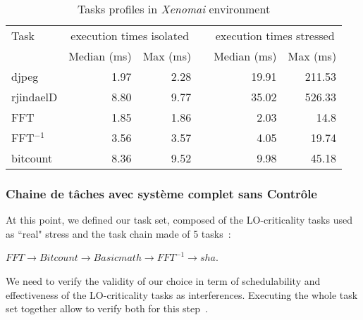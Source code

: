 \documentclass[french, a4paper, 11pt, twoside, pdftex]{StyleThese}
\begin{document}
                        \begin{table}[ht]
                            \centering
                            \caption{Tasks profiles in \textit{Xenomai} environment}
                            \label{tab:Stress}
                        \begin{tabular}{@{}lrrcrr@{}}  %
                        \toprule
                        Task & \multicolumn{2}{c}{execution times isolated} & \phantom{abc}& \multicolumn{2}{c}{execution times stressed} \\
                        \cmidrule{2-3} \cmidrule{5-6} 
                                    &   Median (ms) &   Max (ms)    &&   Median (ms) &   Max (ms)     \\
                        \midrule
                        djpeg       &  1.97     &  2.28      &&  19.91       & 211.53    \\
                        rjindaelD   &   8.80    &  9.77      && 35.02        & 526.33    \\
                        FFT         &   1.85    &  1.86      &&  2.03        & 14.8     \\
                        FFT$^{-1}$  &   3.56    &   3.57     &&  4.05        & 19.74    \\
                        bitcount    &   8.36    &  9.52      &&  9.98        & 45.18    \\
                        \hline
                        \end{tabular}
                                \label{tab:xenoIsolMinMax}
                    \end{table}
                    
            \subsubsection{Chaine de tâches avec système complet sans Contrôle}
                        At this point, we defined our task set, composed of the LO-criticality tasks used as ``real" stress and the task chain made of 5 tasks~: 
                        \centerline{ $ FFT \rightarrow Bitcount  \rightarrow Basicmath  \rightarrow FFT^{-1} \rightarrow sha $.}
                        We need to verify the validity of our choice in term of schedulability and effectiveness of the LO-criticality tasks as interferences. Executing the whole task set together allow to verify both for this step~\circleTxt[3].
                         
\end{document}
